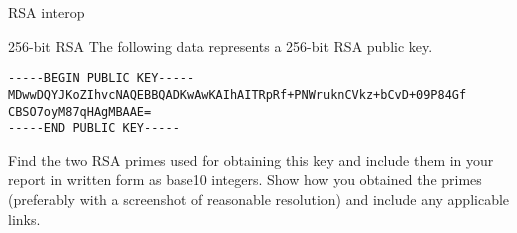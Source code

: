 \documentclass{homework}
\begin{document}
\begin{task}{RSA interop}
  \iffalse
  \begin{tcolorbox}[title=Reading comprehension]
    Beware!
    If you submit a homework which:
    \begin{itemize}
      \item does not pass the test script \textbf{and}
      \item do not mention this in your report \textbf{and}
      \item do not describe in your report what you tried and what problems you still have,
    \end{itemize}
    I will consider your homework as unsubmitted for grading.
    If the deadline hits with your homework in this state, you fail the homework.
    \tcblower
    Motivation: in cryptography (and cybersecurity in general), paying close attention to details is crucial.
    If you cannot be bothered to pay attention and check whether things work, you should not work in cryptography.
  \end{tcolorbox}
  \fi
\end{task}

\begin{task}{256-bit RSA}
  The following data represents a 256-bit RSA public key.
  \begin{Verbatim}
-----BEGIN PUBLIC KEY-----
MDwwDQYJKoZIhvcNAQEBBQADKwAwKAIhAITRpRf+PNWruknCVkz+bCvD+09P84Gf
CBSO7oyM87qHAgMBAAE=
-----END PUBLIC KEY-----
  \end{Verbatim}
  Find the two RSA primes used for obtaining this key and include them in your report in written form as base10 integers.
  Show how you obtained the primes (preferably with a screenshot of reasonable resolution) and include any applicable links.
\end{task}
\end{document}
